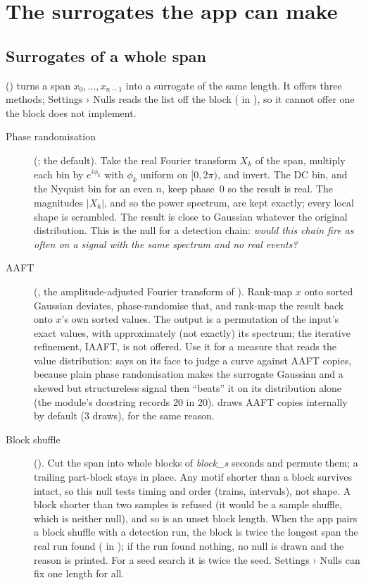 \section{The surrogates the app can make}\label{sec:nulls-surrogates}
\subsection{Surrogates of a whole span}
 () turns a span
$x_0,\dots,x_{n-1}$ into a surrogate of the same length. It offers three methods; Settings ›
Nulls reads the list off the block ( in
), so it cannot offer one the block does not
implement.

\begin{description}
\item[Phase randomisation] (; the default). Take the real Fourier
  transform $X_k$ of the span, multiply each bin by $e^{i\phi_k}$ with $\phi_k$ uniform on
  $[0, 2\pi)$, and invert. The DC bin, and the Nyquist bin for an even $n$, keep phase~0 so the
  result is real. The magnitudes $|X_k|$, and so the power spectrum, are kept exactly; every
  local shape is scrambled. The result is close to Gaussian whatever the original
  distribution. This is the null for a detection chain: \emph{would this chain fire as often
  on a signal with the same spectrum and no real events?}
\item[AAFT] (, the amplitude-adjusted Fourier transform of
  \citet{theiler1992testing}). Rank-map $x$ onto sorted Gaussian deviates, phase-randomise
  that, and rank-map the result back onto $x$'s own sorted values. The output is a
  permutation of the input's exact values, with approximately (not exactly) its spectrum;
  the iterative refinement, IAAFT, is not offered. Use it for a measure that reads the value
  distribution:  says on its face to judge a curve
  against AAFT copies, because plain phase randomisation makes the surrogate Gaussian and a
  skewed but structureless signal then ``beats'' it on its distribution alone (the module's
  docstring records 20 in 20).  draws AAFT copies
  internally by default (3 draws), for the same reason.
\item[Block shuffle] (). Cut the span into whole blocks of
  \emph{block\_s} seconds and permute them; a trailing part-block stays in place. Any motif
  shorter than a block survives intact, so this null tests timing and order (trains,
  intervals), not shape. A block shorter than two samples is refused (it would be a sample
  shuffle, which is neither null), and so is an unset block length. When the app pairs a block
  shuffle with a detection run, the block is twice the longest span the real run found
  ( in ); if the run found nothing,
  no null is drawn and the reason is printed. For a seed search it is twice the seed. Settings
  › Nulls can fix one length for all.
\end{description}

